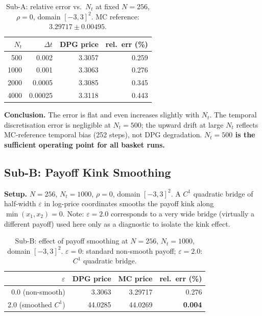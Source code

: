 \documentclass[11pt,a4paper]{article}
\begin{document}
\begin{table}[htbp]
\centering
\caption{Sub-A: relative error vs.\ $N_t$ at fixed $N=256$, $\rho=0$,
  domain $[-3,3]^2$.  MC reference: $3.29717\pm0.00495$.}
\label{tab:diag-temporal}
\begin{tabular}{rrrr}
\toprule
$N_t$ & $\Delta t$ & DPG price & rel.\ err (\%) \\
\midrule
  500  & 0.002   & 3.3057 & 0.259 \\
 1000  & 0.001   & 3.3063 & 0.276 \\
 2000  & 0.0005  & 3.3085 & 0.345 \\
 4000  & 0.00025 & 3.3118 & 0.443 \\
\bottomrule
\end{tabular}
\end{table}

\textbf{Conclusion.}
The error is flat and even increases slightly with $N_t$.
The temporal discretisation error is negligible at $N_t=500$;
the upward drift at large $N_t$ reflects MC-reference temporal bias
(252 steps), not DPG degradation.
\textbf{$N_t=500$ is the sufficient operating point for all basket runs.}

\subsection{Sub-B: Payoff Kink Smoothing}
\label{sec:diag-kink}

\textbf{Setup.}  $N=256$, $N_t=1000$, $\rho=0$, domain $[-3,3]^2$.
A $C^1$ quadratic bridge of half-width $\varepsilon$ in log-price coordinates
smooths the payoff kink along $\min(x_1,x_2)=0$.
Note: $\varepsilon=2.0$ corresponds to a very wide bridge (virtually a
different payoff) used here only as a diagnostic to isolate the kink effect.

\begin{table}[htbp]
\centering
\caption{Sub-B: effect of payoff smoothing at $N=256$, $N_t=1000$,
  domain $[-3,3]^2$.  $\varepsilon=0$: standard non-smooth payoff;
  $\varepsilon=2.0$: $C^1$ quadratic bridge.}
\label{tab:diag-kink}
\begin{tabular}{rrrr}
\toprule
$\varepsilon$ & DPG price & MC price & rel.\ err (\%) \\
\midrule
  0.0 (non-smooth) & 3.3063 & 3.29717 & 0.276 \\
  2.0 (smoothed $C^1$) & 44.0285 & 44.0269 & \textbf{0.004} \\
\bottomrule
\end{tabular}
\end{table}
\end{document}
